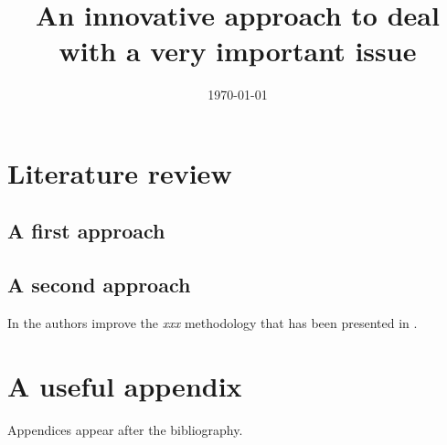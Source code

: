 \documentclass[draft]{gsemthesis} %
\title{An innovative approach to deal with a very important issue}
\date{\today}
\begin{document}
\printcoverpage
%
\printfrontmatter

\startintroduction 
%
%
%



\chapter{Literature review}
\label{ch:lt}

\lipsum[30]

\section{A first approach}

\lipsum[31-50]

\section{A second approach}

\lipsum[51-70]

In \textcite{keyref2} the authors improve the \emph{xxx} methodology that has been presented in \autocite{keyref1}.




\startconclusion

\lipsum[100-109]







\listoftables
\listoffigures


\newpage
\printbibliography


\appendix
\chapter{A useful appendix}

Appendices appear after the bibliography. 
\end{document}
